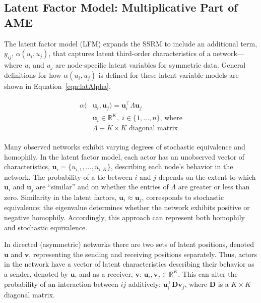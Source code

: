\documentclass[12pt]{amsart}
\begin{document}
\subsection{\textbf{Latent Factor Model: Multiplicative Part of AME}}

The latent factor model (LFM) expands the SSRM to include an additional term, $y_{ij}$, $\alpha(u_{i}, u_{j})$, that captures latent third-order characteristics of a network---where $u_{i}$ and $u_{j}$ are node-specific latent variables for symmetric data. General definitions for how $\alpha(u_{i}, u_{j})$ is defined for these latent variable models are shown in Equation~\ref{eqn:latAlpha}. 

\begin{align}
\begin{aligned}
	\alpha(&\textbf{u}_{i}, \textbf{u}_{j}) = \textbf{u}_{i}^{\top} \Lambda \textbf{u}_{j} \\
	&\textbf{u}_{i} \in \mathbb{R}^{K}, \; i \in \{1, \ldots, n \} \text{, where}\\
	 &\Lambda \equiv K \times K \text{ diagonal matrix}
\label{eqn:latAlpha}
\end{aligned}
\end{align}

Many observed  networks exhibit varying degrees of stochastic equivalence and homophily.  In the latent factor model, each actor has an unobserved vector of characteristics, $\textbf{u}_{i} = \{u_{i,1}, \ldots, u_{i,K} \}$, describing each node's behavior in the network. The probability of a tie between $i$ and $j$ depends on the extent to which $\textbf{u}_{i}$ and $\textbf{u}_{j}$ are ``similar'' and on whether the entries of $\Lambda$ are greater or less than zero. Similarity in the latent factors, $\textbf{u}_{i} \approx \textbf{u}_{j}$, corresponds to stochastic equivalence; the eigenvalue determines whether the network exhibits positive or negative homophily. Accordingly, this approach can represent both homophily and stochastic equivalence. 

In directed (asymmetric) networks there are two sets of latent positions, denoted $\textbf{u}$ and $\textbf{v}$, representing the sending and receiving positions separately.  Thus, actors in the network have a vector of latent characteristics describing their behavior as a sender, denoted by $\textbf{u}$, and as a receiver, $\textbf{v}$: $\textbf{u}_{i}, \textbf{v}_{j} \in \mathbb{R}^{K}$. This can alter the probability of an interaction between $ij$ additively: $\textbf{u}_{i}^{\top} \textbf{D} \textbf{v}_{j}$, where $\textbf{D}$ is a $K \times K$ diagonal matrix.
\end{document}
